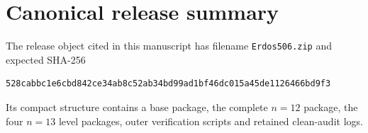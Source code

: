 \section{Canonical release summary}

The release object cited in this manuscript has filename \texttt{Erdos506.zip} and expected SHA-256
\begin{verbatim}
528cabbc1e6cbd842ce34ab8c52ab34bd99ad1bf46dc015a45de1126466bd9f3
\end{verbatim}
Its compact structure contains a base package, the complete $n=12$ package, the four $n=13$ level packages, outer verification scripts and retained clean-audit logs.

